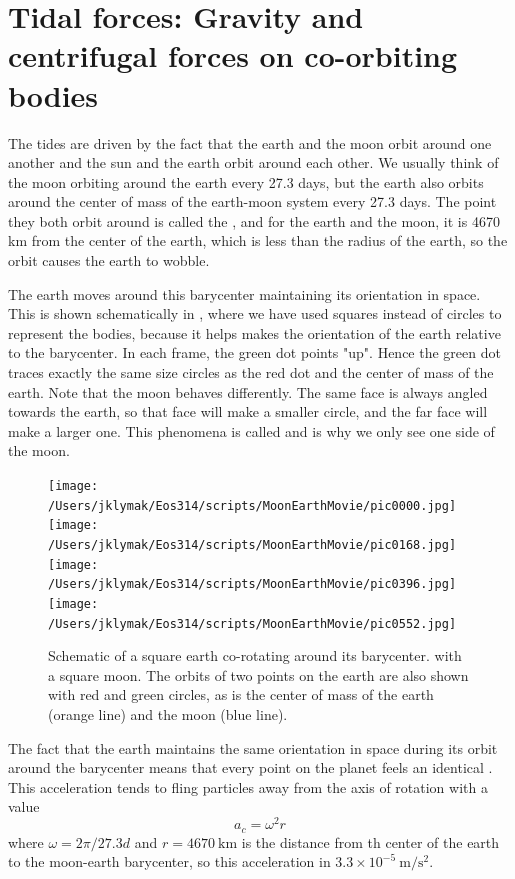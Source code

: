 \section{Tidal forces: Gravity and centrifugal forces on co-orbiting bodies}

The tides are driven by the fact that the earth and the moon orbit around one another and the sun and the earth orbit around each other. We usually think of the moon orbiting around the earth every 27.3 days, but the earth also orbits around the center of mass of the earth-moon system every 27.3 days. The point they both orbit around is called the , and for the earth and the moon, it is 4670 km from the center of the earth, which is less than the radius of the earth, so the orbit causes the earth to wobble.  

The earth moves around this barycenter maintaining its orientation in space. This  is shown schematically in , where we have used squares instead of circles to represent the bodies, because it helps makes the orientation of the earth relative to the barycenter.  In each frame, the green dot points "up". Hence the green dot traces exactly the same size circles as the red dot and the center of mass of the earth. Note that the moon behaves differently.  The same face is always angled towards the earth, so that face will make a smaller circle, and the far face will make a larger one.  This phenomena is called  and is why we only see one side of the moon.  

\begin{figure}[hbtp]
  \begin{center}
    \texttt{[image: /Users/jklymak/Eos314/scripts/MoonEarthMovie/pic0000.jpg]}
    \texttt{[image: /Users/jklymak/Eos314/scripts/MoonEarthMovie/pic0168.jpg]}
    \texttt{[image: /Users/jklymak/Eos314/scripts/MoonEarthMovie/pic0396.jpg]}
    \texttt{[image: /Users/jklymak/Eos314/scripts/MoonEarthMovie/pic0552.jpg]}
    \caption{Schematic of a square earth co-rotating around its barycenter. with a square moon.  The orbits of two points on the earth are also shown with red and green circles, as is the center of mass of the earth (orange line) and the moon (blue line).  }
    \label{fig:coorbit}
  \end{center}
\end{figure}

The fact that the earth maintains the same orientation in space during its orbit around the barycenter means that every point on the planet feels an identical .  This acceleration tends to fling particles away from the axis of rotation with a value 
\begin{equation}
  a_c = \omega^2 r
\end{equation}
where $\omega = 2\pi / 27.3d$ and $r=4670\ \mathrm{km}$ is the distance from th center of the earth to the moon-earth barycenter, so this acceleration in $3.3\times10^{-5}\ \mathrm{m/s^2}$.  

